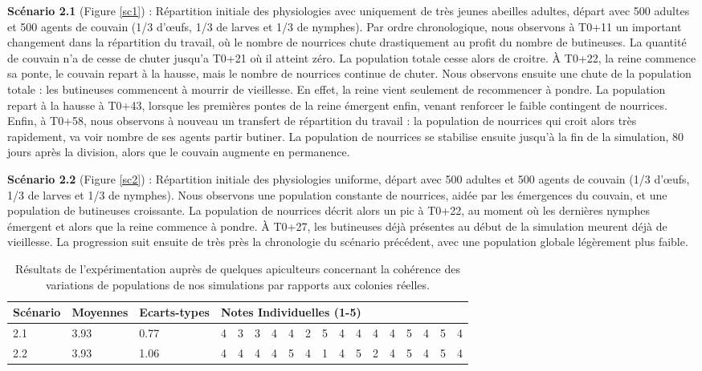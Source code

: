 		\textbf{Scénario 2.1} (Figure \ref{sc1}) : Répartition initiale des physiologies avec uniquement de très jeunes abeilles adultes, départ avec 500 adultes et 500 agents de couvain (1/3 d'œufs, 1/3 de larves et 1/3 de nymphes). Par ordre chronologique, nous observons à T0+11 un important changement dans la répartition du travail, où le nombre de nourrices chute drastiquement au profit du nombre de butineuses. La quantité de couvain n'a de cesse de chuter jusqu'a T0+21 où il atteint zéro. La population totale cesse alors de croitre. À T0+22, la reine commence sa ponte, le couvain repart à la hausse, mais le nombre de nourrices continue de chuter. Nous observons ensuite une chute de la population totale : les butineuses commencent à mourrir de vieillesse. En effet, la reine vient seulement de recommencer à pondre. La population repart à la hausse à T0+43, lorsque les premières pontes de la reine émergent enfin, venant renforcer le faible contingent de nourrices. Enfin, à T0+58, nous observons à nouveau un transfert de répartition du travail : la population de nourrices qui croit alors très rapidement, va voir nombre de ses agents partir butiner. La population de nourrices se stabilise ensuite jusqu'à la fin de la simulation, 80 jours après la division, alors que le couvain augmente en permanence.
		
		\textbf{Scénario 2.2} (Figure \ref{sc2}) : Répartition initiale des physiologies uniforme, départ avec 500 adultes et 500 agents de couvain (1/3 d'œufs, 1/3 de larves et 1/3 de nymphes). Nous observons une population constante de nourrices, aidée par les émergences du couvain, et une population de butineuses croissante. La population de nourrices décrit alors un pic à T0+22, au moment où les dernières nymphes émergent et alors que la reine commence à pondre. À T0+27, les butineuses déjà présentes au début de la simulation meurent déjà de vieillesse. La progression suit ensuite de très près la chronologie du scénario précédent, avec une population globale légèrement plus faible.
	
	
	\begin{table}
	\centering
	\begin{tabular}{l|l|l|lllllllllllllll}
	Scénario & Moyennes & Ecarts-types & \multicolumn{15}{l}{Notes Individuelles (1-5)}\\
	\hline
	2.1 & 3.93 & 0.77 &4&3&3&4&4&2&5&4&4&4&4&5&4&5&4\\
	2.2 & 3.93 & 1.06 &4&4&4&4&5&4&1&4&5&2&4&5&4&5&4\\	
	\end{tabular}
	\caption{Résultats de l'expérimentation auprès de quelques apiculteurs concernant la cohérence des variations de populations de nos simulations par rapports aux colonies réelles.}
	\label{TabResCoherence}
	\end{table}
	
